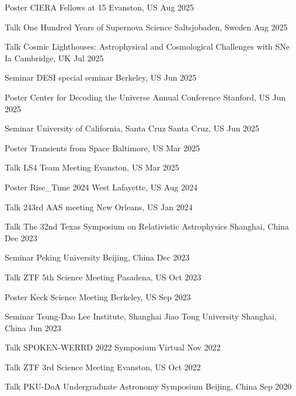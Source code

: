 


\begin{cventries}
	
	\cvsimsimpentry
	{Poster}
	{CIERA Fellows at 15}
	{Evanston, US}
	{Aug 2025}

	\cvsimsimpentry
	{Talk}
	{One Hundred Years of Supernova Science}
	{Saltsjobaden, Sweden}
	{Aug 2025}

	\cvsimsimpentry
	{Talk}
	{Cosmic Lighthouses: Astrophysical and Cosmological Challenges with SNe Ia}
	{Cambridge, UK}
	{Jul 2025}

	\cvsimsimpentry
	{Seminar}
	{DESI special seminar}
	{Berkeley, US}
	{Jun 2025}

	\cvsimsimpentry
	{Poster}
	{Center for Decoding the Universe Annual Conference}
	{Stanford, US}
	{Jun 2025}

	\cvsimsimpentry
	{Seminar}
	{University of California, Santa Cruz}
	{Santa Cruz, US}
	{Jun 2025}

	\cvsimsimpentry
	{Poster}
	{Transients from Space}
	{Baltimore, US}
	{Mar 2025}

	\cvsimsimpentry
	{Talk}
	{LS4 Team Meeting}
	{Evanston, US}
	{Mar 2025}

	\cvsimsimpentry
	{Poster}
	{Rise\_Time 2024}
	{West Lafayette, US}
	{Aug 2024}

	\cvsimsimpentry
	{Talk}
	{243rd AAS meeting}
	{New Orleans, US}
	{Jan 2024}

	\cvsimsimpentry
	{Talk}
	{The 32nd Texas Symposium on Relativistic Astrophysics}
	{Shanghai, China}
	{Dec 2023}

	\cvsimsimpentry
	{Seminar}
	{Peking University}
	{Beijing, China}
	{Dec 2023}

	\cvsimsimpentry
	{Talk}
	{ZTF 5th Science Meeting}
	{Pasadena, US}
	{Oct 2023}
	
	\cvsimsimpentry
	{Poster}
	{Keck Science Meeting}
	{Berkeley, US}
	{Sep 2023}

	\cvsimsimpentry
	{Seminar}
	{Tsung-Dao Lee Institute, Shanghai Jiao Tong University}
	{Shanghai, China}
	{Jun 2023}

	\cvsimsimpentry
	{Talk}
	{SPOKEN-WERRD 2022 Symposium} %
	{Virtual} %
	{Nov 2022} %

	\cvsimsimpentry
	{Talk} %
	{ZTF 3rd Science Meeting} %
	{Evanston, US} %
	{Oct 2022} %
	
	\cvsimsimpentry
	{Talk} %
	{PKU-DoA Undergraduate Astronomy Symposium} %
	{Beijing, China} %
	{Sep 2020} %

\end{cventries}